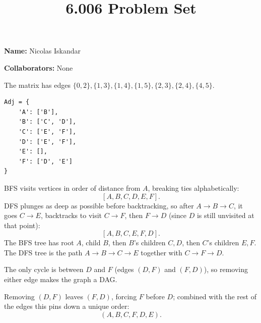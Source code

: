 \documentclass[12pt,twoside]{article}
\title{6.006 Problem Set \theproblemsetnum}
\newcommand{\theproblemsetnum}{5}
\begin{document}
\handout{Problem Set \theproblemsetnum}

\setlength{\parindent}{0pt}
\medskip\hrulefill\medskip

{\bf Name:} Nicolas Iskandar

\medskip

{\bf Collaborators:} None

\medskip\hrulefill

\begin{problems}
\problem  %

\begin{problemparts}
\problempart %
The matrix has edges $\{0,2\}, \{1,3\}, \{1,4\}, \{1,5\}, \{2,3\}, \{2,4\}, \{4,5\}$.
\begin{center}
\end{center}

\problempart %
{\color{dkgreen}}
\begin{lstlisting}
Adj = {
    'A': ['B'],
    'B': ['C', 'D'],
    'C': ['E', 'F'],
    'D': ['E', 'F'],
    'E': [],
    'F': ['D', 'E']
}
\end{lstlisting}

\problempart %
BFS visits vertices in order of distance from $A$, breaking ties alphabetically:
\[
[A, B, C, D, E, F].
\]
DFS plunges as deep as possible before backtracking, so after $A \to B \to C$, it goes $C \to E$, backtracks to visit $C \to F$, then $F \to D$ (since $D$ is still unvisited at that point):
\[
[A, B, C, E, F, D].
\]
The BFS tree has root $A$, child $B$, then $B$'s children $C, D$, then $C$'s children $E, F$. The DFS tree is the path $A \to B \to C \to E$ together with $C \to F \to D$.

\problempart %
The only cycle is between $D$ and $F$ (edges $(D,F)$ and $(F,D)$), so removing either edge makes the graph a DAG.

Removing $(D,F)$ leaves $(F,D)$, forcing $F$ before $D$; combined with the rest of the edges this pins down a unique order:
\[
(A, B, C, F, D, E).
\]


\end{problemparts}
\end{problems}
\end{document}

